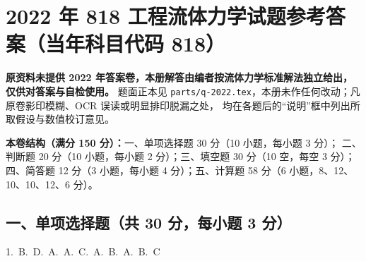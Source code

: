 \chapter{2022 年 818 工程流体力学试题参考答案（当年科目代码 818）}

\begin{tishi}
\textbf{原资料未提供 2022 年答案卷，本册解答由编者按流体力学标准解法独立给出，仅供对答案与自检使用。}
题面正本见 \texttt{parts/q-2022.tex}，本册未作任何改动；凡原卷影印模糊、OCR 误读或明显排印脱漏之处，
均在各题后的“说明”框中列出所取假设与数值校订意见。

\textbf{本卷结构（满分 150 分）：}一、单项选择题 30 分（10 小题，每小题 3 分）；
二、判断题 20 分（10 小题，每小题 2 分）；三、填空题 30 分（10 空，每空 3 分）；
四、简答题 12 分（3 小题，每小题 4 分）；五、计算题 58 分（6 小题，8、12、10、10、12、6 分）。
\end{tishi}

\section{一、单项选择题（共 30 分，每小题 3 分）}

\begin{center}
1.~B.~D.~A.~A.~C.~A.~B.~A.~B.~C
\end{center}

